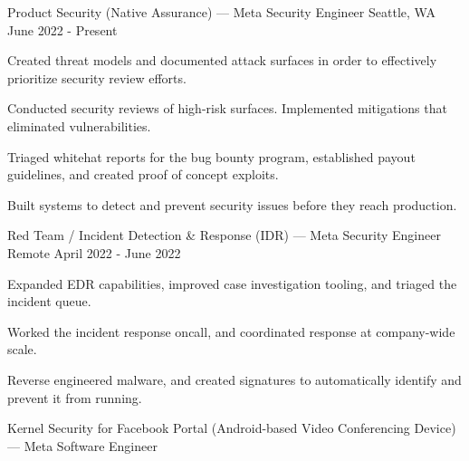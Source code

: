 
\begin{cventries}

\cventry
{Product Security (Native Assurance) — Meta} %
{Security Engineer} %
{Seattle, WA} %
{June 2022 - Present} %
{
	\begin{cvitems} %
		\item {Created threat models and documented attack surfaces in order to effectively prioritize security review efforts.}
		\item {Conducted security reviews of high-risk surfaces. Implemented mitigations that eliminated vulnerabilities.}
		\item {Triaged whitehat reports for the bug bounty program, established payout guidelines, and created proof of concept exploits.}
		\item {Built systems to detect and prevent security issues before they reach production.}
	\end{cvitems}
}
\cventry
{Red Team / Incident Detection \& Response (IDR) —  Meta} %
{Security Engineer} %
{Remote} %
{April 2022 - June 2022} %
{
	\begin{cvitems} %
		\item {Expanded EDR capabilities, improved case investigation tooling, and triaged the incident queue.}
		\item {Worked the incident response oncall, and coordinated response at company-wide scale.}
		\item {Reverse engineered malware, and created signatures to automatically identify and prevent it from running.}
	\end{cvitems}
}
\cventry
{Kernel Security for Facebook Portal (Android-based Video Conferencing Device) — Meta} %
{Software Engineer} %

\end{cventries}

